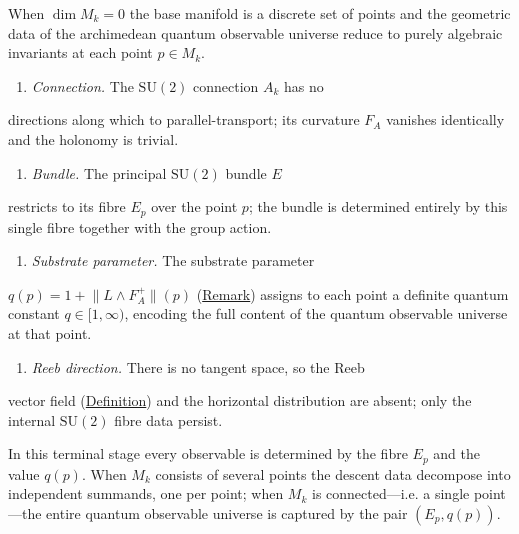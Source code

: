 \begin{remark}
  \label{rem:descent-reduction-zero}
When $\dim M_k = 0$ the base manifold is a discrete set of points and
the geometric data of the archimedean quantum observable universe
reduce to purely algebraic invariants at each point $p\in M_k$.

\begin{enumerate}
  \item \emph{Connection.}  The $\mathrm{SU}(2)$ connection $A_k$ has no
\end{enumerate}
   directions along which to parallel-transport; its curvature
   $F_A$ vanishes identically and the holonomy is trivial.
\begin{enumerate}
  \item \emph{Bundle.}  The principal $\mathrm{SU}(2)$ bundle $E$
\end{enumerate}
   restricts to its fibre $E_p$ over the point $p$; the bundle
   is determined entirely by this single fibre together with
   the group action.
\begin{enumerate}
  \item \emph{Substrate parameter.}  The substrate parameter
\end{enumerate}
   $q(p) = 1 + \lVert L\wedge F_A^{+}\rVert(p)$
   (\hyperref[rem:c-substrate-via-levi]{Remark}) assigns to each point a
   definite quantum constant $q\in[1,\infty)$, encoding the full
   content of the quantum observable universe at that point.
\begin{enumerate}
  \item \emph{Reeb direction.}  There is no tangent space, so the Reeb
\end{enumerate}
   vector field (\hyperref[def:q-reeb-vector-field]{Definition}) and the
   horizontal distribution are absent; only the internal
   $\mathrm{SU}(2)$ fibre data persist.

In this terminal stage every observable is determined by the fibre
$E_p$ and the value $q(p)$.  When $M_k$ consists of several points the
descent data decompose into independent summands, one per point; when
$M_k$ is connected---i.e. a single point---the entire quantum
observable universe is captured by the pair $(E_p, q(p))$.
\end{remark}

